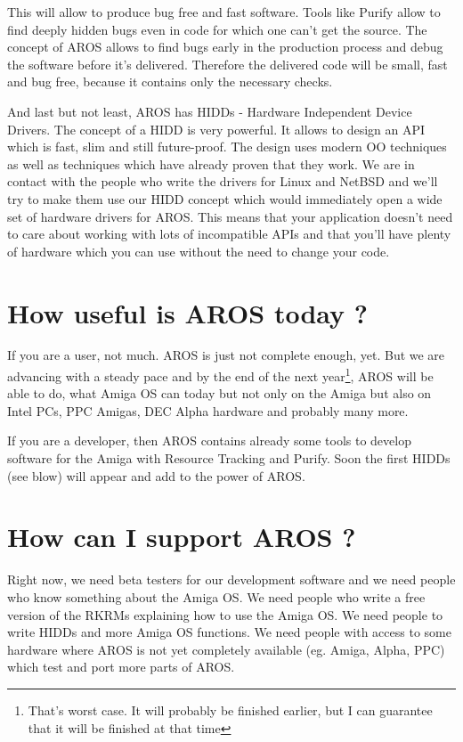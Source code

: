 This will allow to produce bug free and fast software. Tools like Purify
allow to find deeply hidden bugs even in code for which one can't get the
source. The concept of AROS allows to find bugs early in the production
process and debug the software before it's delivered. Therefore the
delivered code will be small, fast and bug free, because it contains only
the necessary checks.

And last but not least, AROS has HIDDs - Hardware Independent Device
Drivers. The concept of a HIDD is very powerful. It allows to design an API
which is fast, slim and still future-proof. The design uses modern OO
techniques as well as techniques which have already proven that they work.
We are in contact with the people who write the drivers for Linux and
NetBSD and we'll try to make them use our HIDD concept which would
immediately open a wide set of hardware drivers for AROS. This means that
your application doesn't need to care about working with lots of
incompatible APIs and that you'll have plenty of hardware which you can use
without the need to change your code.

\section{How useful is AROS today ?}

If you are a user, not much. AROS is just not complete enough, yet.
But we are advancing with a steady pace and by the end of the next
year\footnote{That's worst case. It will probably be finished earlier, but
I can guarantee that it will be finished at that time}, AROS will be able to
do, what Amiga OS can today but not only on the Amiga but also on Intel PCs,
PPC Amigas, DEC Alpha hardware and probably many more.

If you are a developer, then AROS contains already some tools to
develop software for the Amiga with Resource Tracking and Purify.
Soon the first HIDDs (see blow) will appear and add to the power of AROS.

\section{How can I support AROS ?}

Right now, we need beta testers for our development software and we need
people who know something about the Amiga OS. We need people who write a
free version of the RKRMs explaining how to use the Amiga OS. We need people
to write HIDDs and more Amiga OS functions. We need people with access to
some hardware where AROS is not yet completely available (eg. Amiga, Alpha,
PPC) which test and port more parts of AROS.

